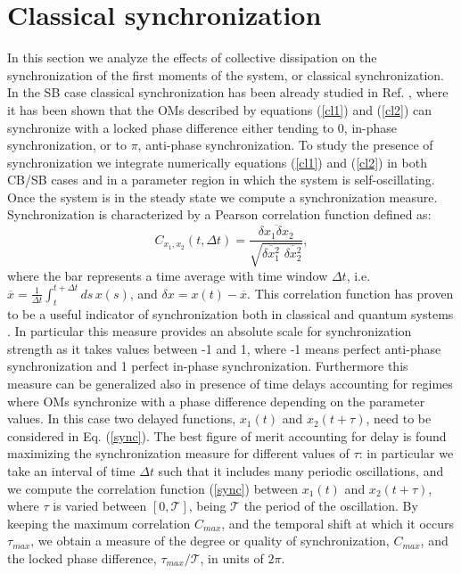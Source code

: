 \documentclass[a4paper]{jpconf}
\begin{document}
\section{Classical synchronization}
\label{sect3}

In this section we analyze the effects of collective dissipation on the 
synchronization of the first moments of the system, or classical 
synchronization. In the SB case classical synchronization has been already 
studied in Ref. \cite{9}, where it has been shown that the OMs described by 
equations (\ref{cl1}) and (\ref{cl2}) can synchronize with a locked phase difference either 
tending to 0, in-phase synchronization, or to $\pi$, anti-phase synchronization. 
To study the presence of synchronization we integrate numerically equations (\ref{cl1}) 
and (\ref{cl2}) in both CB/SB cases and in a parameter region in which the system is 
self-oscillating. Once the system is in the steady state we compute a 
synchronization measure. Synchronization  is characterized by a Pearson 
correlation function defined as:
\begin{equation}\label{sync}
C_{x_1,x_2}(t,\Delta t)=\frac{\overline{\delta x_1\delta 
x_2}}{\sqrt{\overline{\delta x_1 ^2}\, \, \overline{\delta x_2^2}}},
\end{equation}  
where the bar represents a time average with time window $\Delta t$, i.e. 
$\overline{x}=\frac{1}{\Delta t}\int_t^{t+\Delta t}ds\, x(s)$, and $\delta 
x= x(t)-\overline{x}$. This correlation function has proven to be a useful 
indicator of synchronization both in classical and quantum 
systems \cite{55,54}. In particular this measure provides an absolute scale for synchronization strength as it
takes values between -1 
and 1, where -1 means perfect anti-phase synchronization and 1 perfect in-phase 
synchronization. 
Furthermore this measure can be generalized also in presence of time delays
accounting for regimes where 
OMs synchronize with a phase difference depending on the 
parameter values. In this case two delayed functions, $x_1(t)$ and  $x_2(t+\tau)$, need to be considered
in  Eq. (\ref{sync}). The best figure of merit accounting for delay is found maximizing the synchronization measure
for different values of $\tau$: in particular we take an 
interval of time $\Delta t$ such that it includes many periodic oscillations, 
and we compute the correlation function (\ref{sync}) between $x_1(t)$ and $x_2(t+\tau)$, 
where $\tau$ is varied between $[0,\mathcal{T}]$, being $\mathcal{T}$ the period 
of the oscillation. By keeping the maximum correlation $C_{max}$, and the 
temporal shift at which it occurs $\tau_{max}$, we obtain a measure of the 
degree or quality of synchronization, $C_{max}$, and the locked phase 
difference, $\tau_{max}/\mathcal{T}$, in units of $2\pi$. 
\end{document}
